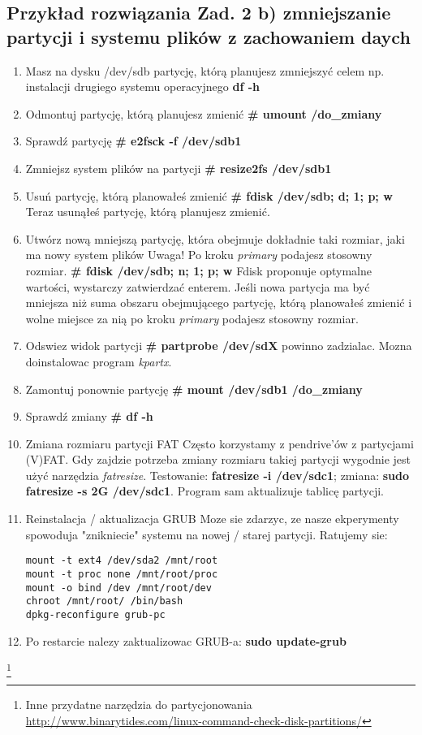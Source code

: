 \documentclass[a4paper,titlepage,12pt]{mwart}
\begin{document}
\subsection{Przykład rozwiązania Zad. 2 b) zmniejszanie partycji i systemu plików z zachowaniem daych}
\begin{enumerate}
\item{Masz na dysku /dev/sdb partycję, którą planujesz zmniejszyć celem np. instalacji drugiego systemu operacyjnego}
\textbf{df -h}
\item{Odmontuj partycję, którą planujesz zmienić}
\textbf{# umount /do_zmiany}
\item{Sprawdź partycję}
\textbf{# e2fsck -f /dev/sdb1}
\item{Zmniejsz system plików na partycji}
\textbf{# resize2fs /dev/sdb1}
\item{Usuń partycję, którą planowałeś zmienić}
\textbf{# fdisk /dev/sdb; d; 1; p; w}
Teraz usunąłeś partycję, którą planujesz zmienić.
\item{Utwórz nową mniejszą partycję, która obejmuje dokładnie taki rozmiar, jaki ma nowy system plików}
Uwaga! Po kroku \textit{primary} podajesz stosowny rozmiar.
\textbf{# fdisk /dev/sdb; n; 1; p; w}
Fdisk proponuje optymalne wartości, wystarczy zatwierdzać enterem. Jeśli nowa partycja ma być mniejsza niż suma obszaru obejmującego partycję, którą planowałeś zmienić i wolne miejsce za nią po kroku \textit{primary} podajesz stosowny rozmiar.
\item{Odswiez widok partycji}
\textbf{# partprobe /dev/sdX} powinno zadzialac. Mozna doinstalowac program \textit{kpartx}.
\item{Zamontuj ponownie partycję}
\textbf{# mount /dev/sdb1 /do_zmiany}
\item{Sprawdź zmiany}
\textbf{# df -h}
\item{Zmiana rozmiaru partycji FAT}
Często korzystamy z pendrive'ów z partycjami (V)FAT. Gdy zajdzie potrzeba zmiany rozmiaru takiej partycji wygodnie jest użyć narzędzia \textit{fatresize}. Testowanie: \textbf{fatresize -i /dev/sdc1}; zmiana: \textbf{sudo fatresize -s 2G /dev/sdc1}. Program sam aktualizuje tablicę partycji.
\item{Reinstalacja / aktualizacja GRUB}
Moze sie zdarzyc, ze nasze ekperymenty spowoduja "znikniecie" systemu na nowej / starej partycji. Ratujemy sie:
\begin{verbatim}
mount -t ext4 /dev/sda2 /mnt/root
mount -t proc none /mnt/root/proc
mount -o bind /dev /mnt/root/dev 
chroot /mnt/root/ /bin/bash
dpkg-reconfigure grub-pc
\end{verbatim}
\item{Po restarcie nalezy zaktualizowac GRUB-a:}
\textbf{sudo update-grub}
\end{enumerate}
\footnote{Inne przydatne narzędzia do partycjonowania \url{http://www.binarytides.com/linux-command-check-disk-partitions/}}
\end{document}
